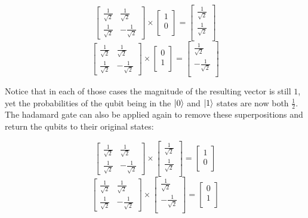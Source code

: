 \documentclass{article}
\begin{document}
\[
	\begin{bmatrix}
		\frac{1}{\sqrt{2}} & \frac{1}{\sqrt{2}} \\
		\frac{1}{\sqrt{2}} & -\frac{1}{\sqrt{2}}
	\end{bmatrix}
	\times
	\begin{bmatrix}
		1 \\
		0 \\
	\end{bmatrix}
	=
	\begin{bmatrix}
		\frac{1}{\sqrt{2}} \\
		\frac{1}{\sqrt{2}} \\
	\end{bmatrix}
\]
\[
	\begin{bmatrix}
		\frac{1}{\sqrt{2}} & \frac{1}{\sqrt{2}} \\
		\frac{1}{\sqrt{2}} & -\frac{1}{\sqrt{2}}
	\end{bmatrix}
	\times
	\begin{bmatrix}
		0 \\
		1 \\
	\end{bmatrix}
	=
	\begin{bmatrix}
		\frac{1}{\sqrt{2}} \\
		-\frac{1}{\sqrt{2}} \\
	\end{bmatrix}
\]

Notice that in each of those cases the magnitude of the resulting vector is still $1$, yet the probabilities of the qubit being in the $\ket{0}$ and $\ket{1}$ states are now
both $ \frac{1}{2}$. The hadamard gate can also be applied again to remove these superpositions and return the qubits to their original states:

\[
	\begin{bmatrix}
		\frac{1}{\sqrt{2}} & \frac{1}{\sqrt{2}} \\
		\frac{1}{\sqrt{2}} & -\frac{1}{\sqrt{2}}
	\end{bmatrix}
	\times
	\begin{bmatrix}
		\frac{1}{\sqrt{2}} \\
		\frac{1}{\sqrt{2}} \\
	\end{bmatrix}
	=
	\begin{bmatrix}
		1 \\
		0 \\
	\end{bmatrix}
\]
\[
	\begin{bmatrix}
		\frac{1}{\sqrt{2}} & \frac{1}{\sqrt{2}} \\
		\frac{1}{\sqrt{2}} & -\frac{1}{\sqrt{2}}
	\end{bmatrix}
	\times
	\begin{bmatrix}
		\frac{1}{\sqrt{2}} \\
		-\frac{1}{\sqrt{2}} \\
	\end{bmatrix}
	=
	\begin{bmatrix}
		0 \\
		1 \\
	\end{bmatrix}
\]
\end{document}
